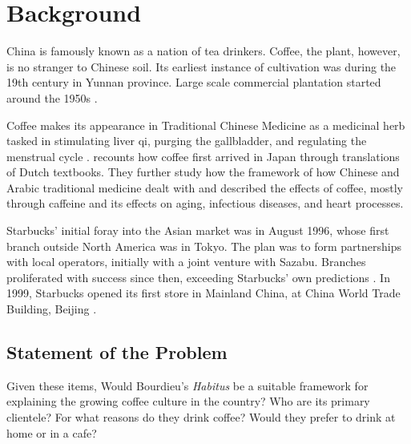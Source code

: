 \section{Background}\label{sec:background}

China is famously known as a nation of tea drinkers. Coffee, the plant, however,
is no stranger to Chinese soil. Its earliest instance of cultivation was during
the 19th century in Yunnan province. Large scale commercial plantation
started around the 1950s \autocite{zhang_coffee_2014}.

Coffee makes its appearance in Traditional Chinese Medicine as a medicinal herb
tasked in stimulating liver qi, purging the gallbladder, and regulating the
menstrual cycle \autocite{dharmananda_coffee_2003}.
\textcite{namba_historical_2001} recounts how coffee first arrived in Japan
through translations of Dutch textbooks. They further study how the framework of
how Chinese and Arabic traditional medicine dealt with and described the effects
of coffee, mostly through caffeine and its effects on aging, infectious
diseases, and heart processes.

Starbucks' initial foray into the Asian market was in August 1996, whose first
branch outside North America was in Tokyo. The plan was to form partnerships
with local operators, initially with a joint venture with Sazabu. Branches
proliferated with success since then, exceeding Starbucks' own predictions
\autocite{harrison_exporting_2005}. In 1999, Starbucks opened its first store in
Mainland China, at China World Trade Building, Beijing
\autocite{starbucks_corporation_history_????}.

\subsection{Statement of the Problem}

Given these items, Would Bourdieu's \emph{Habitus} be a suitable framework for
explaining the growing coffee culture in the country? Who are its primary
clientele? For what reasons do they drink coffee? Would they prefer to drink at
home or in a cafe?

\begin{comment}
\begin{itemize}
	\item Habitus as a framework
	\item Drinker demographics
	\item How did international franchises adapt
	\item How did the coffee culture start
\end{itemize}
\end{comment}
